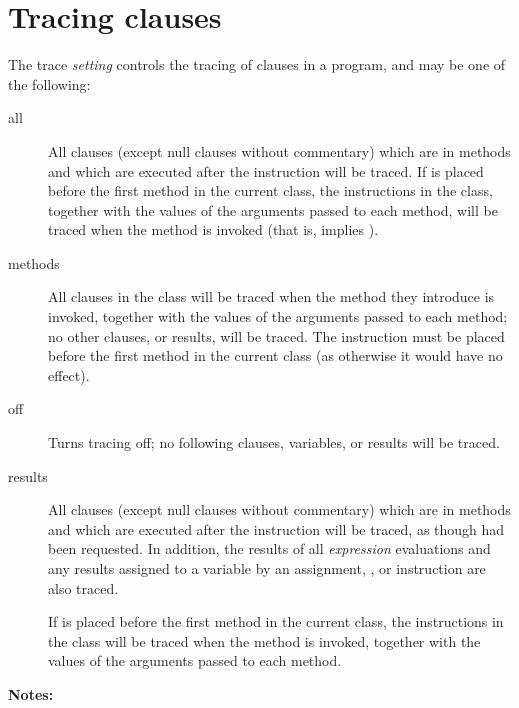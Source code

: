 \section{Tracing clauses}
 
The trace \emph{setting} controls the tracing of clauses in a program, and
may be one of the following:
\begin{description}
\item[all]\label{reftrall}
 All clauses (except null clauses without commentary) which are in
methods and which are executed after the  instruction will
be traced.
If  is placed before the first method in the current
class, the  instructions in the class,
together with the values of the arguments passed to each method,
will be traced when the method is invoked (that is, 
implies ).
\item[methods]\label{reftrmeth}
 
All  clauses in the class will be traced when the method
they introduce is invoked, together with the values of the arguments
passed to each method; no other clauses, or results, will be traced.
The  instruction must be placed before the first
method in the current class (as otherwise it would have no effect).
\item[off]\label{reftroff}
 
Turns tracing off; no following clauses, variables, or results will be traced.
\item[results]\label{reftrres}
 All clauses (except null clauses without commentary) which are in
methods and which are executed after the  instruction will
be traced, as though  had been requested.
In addition, the results of all \emph{expression} evaluations and
any results assigned to a variable by an assignment, , or
 instruction are also traced.
 
If  is placed before the first method in the
current class, the  instructions in the class will be
traced when the method is invoked, together with the values of the
arguments passed to each method.
\end{description}
 \textbf{Notes:}
